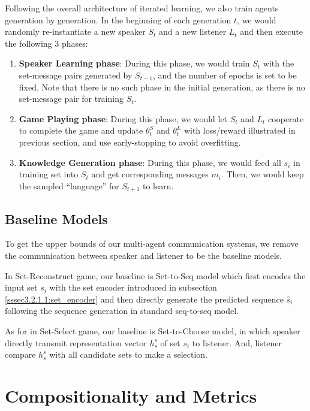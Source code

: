 Following the overall architecture of iterated learning, we also train agents generation by generation. In the beginning of each generation $t$, we would randomly re-instantiate a new speaker $S_t$ and a new listener $L_t$ and then execute the following 3 phases:

\begin{enumerate}
  \item \textbf{Speaker Learning phase}: During this phase, we would train $S_t$ with the set-message pairs generated by $S_{t-1}$, and the number of epochs is set to be fixed. Note that there is no such phase in the initial generation, as there is no set-message pair for training $S_t$.
  \item \textbf{Game Playing phase}: During this phase, we would let $S_t$ and $L_t$ cooperate to complete the game and update $\theta^S_t$ and $\theta^L_t$ with loss/reward illustrated in previous section, and use early-stopping to avoid overfitting.
  \item \textbf{Knowledge Generation phase}: During this phase, we would feed all $s_i$ in training set into $S_t$ and get corresponding messages $m_i$. Then, we would keep the sampled ``language'' for $S_{t+1}$ to learn.
\end{enumerate}

\subsection{Baseline Models}
\label{ssec3.2.5:baselines}

To get the upper bounds of our multi-agent communication systems, we remove the communication between speaker and listener to be the baseline models.

In Set-Reconstruct game, our baseline is Set-to-Seq model which first encodes the input set $s_i$ with the set encoder introduced in subsection \ref{sssec3.2.1.1:set_encoder} and then directly generate the predicted sequence $\hat{s}_i$ following the sequence generation in standard seq-to-seq model.

As for in Set-Select game, our baseline is Set-to-Choose model, in which speaker directly transmit representation vector $h^s_s$ of set $s_i$ to listener. And, listener compare $h^s_s$ with all candidate sets to make a selection.

\section{Compositionality and Metrics}
\label{sec3.3:metrics}

